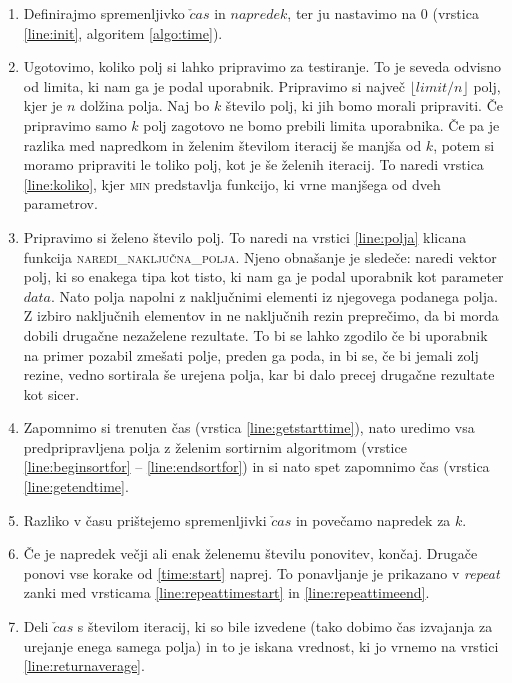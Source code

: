 \documentclass[a4paper,oneside,12pt]{article}
\begin{document}
\begin{enumerate}
  \item Definirajmo spremenljivko $\check{c}as$ in $napredek$, ter ju nastavimo na 0
    (vrstica \ref{line:init}, algoritem \ref{algo:time}).
  \item \label{time:start} Ugotovimo, koliko polj si lahko pripravimo za testiranje. To je seveda odvisno od
    limita, ki nam ga je podal uporabnik. Pripravimo si največ $\lfloor limit/n \rfloor$
    polj, kjer je $n$ dolžina polja. Naj bo $k$ število polj, ki jih bomo morali
    pripraviti.
    Če pripravimo samo $k$ polj zagotovo ne bomo prebili limita uporabnika.
    Če pa je razlika med napredkom in želenim številom iteracij še manjša
    od $k$, potem si  moramo pripraviti le toliko polj, kot je še želenih iteracij.
    To naredi vrstica \ref{line:koliko}, kjer \textsc{min} predstavlja funkcijo, ki vrne
    manjšega od dveh parametrov.
  \item Pripravimo si želeno število polj. To naredi na vrstici
    \ref{line:polja} klicana funkcija \textsc{naredi\_naključna\_polja}. Njeno obnašanje
    je sledeče: naredi vektor polj, ki so enakega tipa kot tisto, ki nam ga je podal 
    uporabnik kot parameter $data$. Nato polja napolni z
    naključnimi elementi iz njegovega podanega polja. Z izbiro naključnih elementov in ne 
    naključnih rezin preprečimo, da bi morda dobili drugačne nezaželene rezultate. To bi
    se lahko zgodilo če bi uporabnik na primer pozabil zmešati polje, preden ga poda, in bi se, če bi jemali 
    zolj rezine, vedno sortirala še urejena polja, kar bi dalo precej drugačne rezultate 
    kot sicer.
  \item Zapomnimo si trenuten čas (vrstica \ref{line:getstarttime}), nato uredimo vsa predpripravljena polja z želenim
    sortirnim algoritmom (vrstice \ref{line:beginsortfor} -- \ref{line:endsortfor}) in si
    nato spet zapomnimo čas (vrstica \ref{line:getendtime}.
  \item Razliko v času prištejemo spremenljivki $\check{c}as$ in povečamo napredek za $k$. 
  \item Če je napredek večji ali enak želenemu številu ponovitev, končaj. 
    Drugače ponovi vse korake od \ref{time:start} naprej. To ponavljanje je prikazano v
    \emph{repeat} zanki med vrsticama \ref{line:repeattimestart} in
    \ref{line:repeattimeend}.
  \item Deli $\check{c}as$ s številom iteracij, ki so bile izvedene (tako dobimo čas
    izvajanja za urejanje enega samega polja) in to je iskana vrednost, ki jo vrnemo na
    vrstici \ref{line:returnaverage}.
\end{enumerate}
\end{document}
